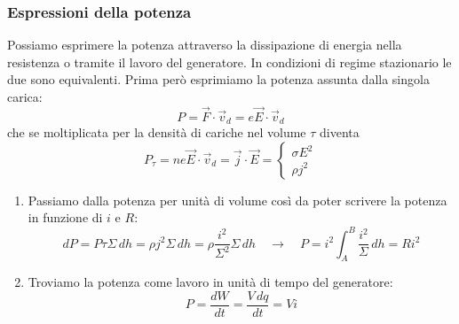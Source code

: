 \documentclass[x11names]{report}
\begin{document}
\subsubsection{Espressioni della potenza}
Possiamo esprimere la potenza attraverso la dissipazione di energia nella resistenza o tramite il lavoro del generatore. In condizioni di regime stazionario le due sono equivalenti. Prima però esprimiamo la potenza assunta dalla singola carica:
\[
P = \vec{F}\cdot \vec{v}_d = e\vec{E}\cdot  \vec{v}_d
\]
che se moltiplicata per la densità di cariche nel volume \(\tau\) diventa
\[
P_\tau = ne\vec{E}\cdot  \vec{v}_d = \vec{j}\cdot \vec{E} = \begin{cases}
	\sigma E^2 \\
	\rho j^2
\end{cases}
\]
\begin{enumerate}
	\item Passiamo dalla potenza per unità di volume così da poter scrivere la potenza in funzione di \(i\) e \(R\):
	\[
	dP = P\tau \Sigma \, dh = \rho j^2 \Sigma \, dh = \rho \frac{i^2}{\Sigma^2}\Sigma \, dh \quad \to \quad P = i^2\int_A^B  \frac{i^2}{\Sigma} \, dh = Ri^2
	\]
	\item Troviamo la potenza come lavoro in unità di tempo del generatore:
	\[
	 P = \frac{dW}{dt} = \frac{V \, dq}{dt} = Vi
	\]
\end{enumerate}
\end{document}

